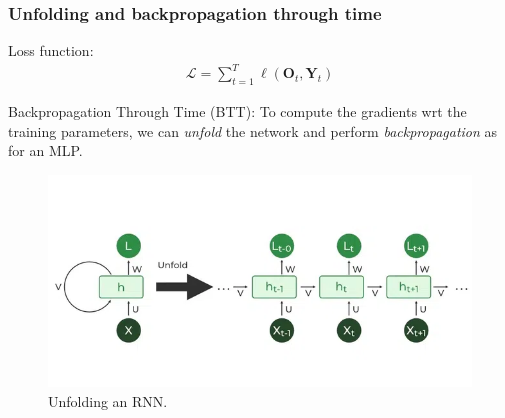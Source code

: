 \documentclass{beamer}
\begin{document}
			\begin{frame}
			\frametitle{Unfolding and backpropagation through time}
			
			Loss function: 	
			\begin{align*}
				\mathcal{L} = \sum_{t=1}^T \ell(\bm{O}_t, \bm{Y}_t)
			\end{align*}
			
			\vspace{2mm}
			
			Backpropagation Through Time (BTT): To compute the gradients wrt the training parameters, we can \textit{unfold} the network and perform \textit{backpropagation} as for an MLP.
			
			\begin{figure}
				\centering
				\includegraphics[scale=0.35]{images/rnn_2}
				\caption{Unfolding an RNN.}

			\end{figure}
		
			
		\end{frame}
		
\end{document}
